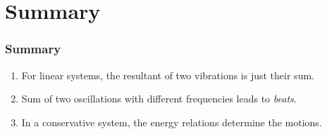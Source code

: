 \documentclass[pdf,hideothersubsections]{beamer}
\begin{document}
\section{Summary}
\begin{frame}
\frametitle{Summary}
\begin{enumerate}
\pause
\item For linear systems, the resultant of two vibrations is just their sum.
\pause
\item Sum of two oscillations with different frequencies leads to \emph{beats}.
\pause
\item In a conservative system, the energy relations determine the
  motions.
\end{enumerate}
\end{frame}
\end{document}
